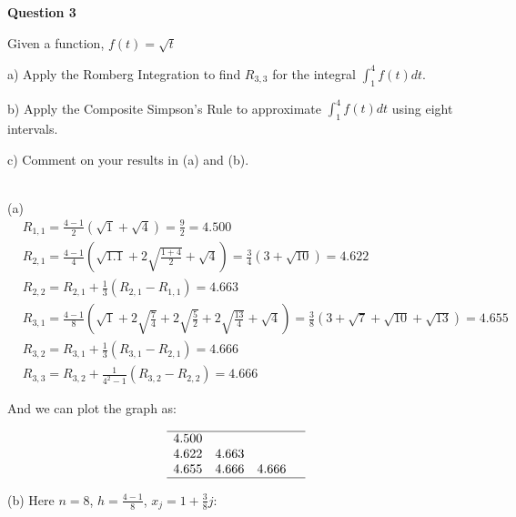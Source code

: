 

\begin{tcolorbox}
\textbf{Question 3} 

Given a function, $f(t)=\sqrt{t}$


a) Apply the Romberg Integration to find $R_{3,3}$ for the integral $\int_{1}^{4} f(t) d t$.


b) Apply the Composite Simpson's Rule to approximate $\int_{1}^{4} f(t) d t$ using eight intervals.


c) Comment on your results in (a) and (b).

\end{tcolorbox}

\begin{solution}\ \\

(a)
\begin{equation}
\begin{aligned}
&R_{1,1}=\frac{4-1}{2}(\sqrt{1}+\sqrt{4})=\frac{9}{2}=4.500 \\
&R_{2,1}=\frac{4-1}{4}\left(\sqrt{1.1}+2 \sqrt{\frac{1+4}{2}}+\sqrt{4}\right)=\frac{3}{4}(3+\sqrt{10})=4.622 \\
&R_{2,2}=R_{2,1}+\frac{1}{3}\left(R_{2,1}-R_{1,1}\right)=4.663 \\
&R_{3,1}=\frac{4-1}{8}\left(\sqrt{1}+2 \sqrt{\frac{7}{4}}+2 \sqrt{\frac{5}{2}}+2 \sqrt{\frac{13}{4}}+\sqrt{4}\right)=\frac{3}{8}(3+\sqrt{7}+\sqrt{10}+\sqrt{13})=4.655 \\
&R_{3,2}=R_{3,1}+\frac{1}{3}\left(R_{3,1}-R_{2,1}\right)=4.666 \\
&R_{3,3}=R_{3,2}+\frac{1}{4^{2}-1}\left(R_{3,2}-R_{2,2}\right)=4.666
\end{aligned}
\end{equation}



And we can plot the graph as:


\begin{equation*}
\begin{array}{lll}
\hline
4.500 & & \\
4.622 & 4.663 & \\
4.655 & 4.666 \quad 4.666 \\
\hline
\end{array}
\end{equation*}

\dotfill



(b) Here $n=8$, $h=\frac{4-1}{8}$, $x_{j}=1+\frac{3}{8} j$:



\end{solution}
